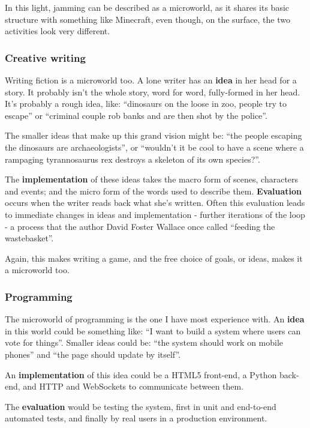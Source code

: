 In this light, jamming can be described as a microworld, as it shares
its basic structure with something like Minecraft, even though, on the
surface, the two activities look very different.

\subsubsection{Creative writing}

Writing fiction is a microworld too. A lone writer has an \textbf{idea}
in her head for a story. It probably isn't the whole story, word for
word, fully-formed in her head. It's probably a rough idea, like:
``dinosaurs on the loose in zoo, people try to escape'' or ``criminal
couple rob banks and are then shot by the police''.

The smaller ideas that make up this grand vision might be: ``the people
escaping the dinosaurs are archaeologists'', or ``wouldn't it be cool to
have a scene where a rampaging tyrannosaurus rex destroys a skeleton of
its own species?''.

The \textbf{implementation} of these ideas takes the macro form of
scenes, characters and events; and the micro form of the words used to
describe them. \textbf{Evaluation} occurs when the writer reads back
what she's written. Often this evaluation leads to immediate changes in ideas and implementation - further iterations of the loop - a process that the author David Foster Wallace once called ``feeding the wastebasket''\cite{flesh}.

Again, this makes writing a game, and the free choice of goals, or
ideas, makes it a microworld too.

\subsubsection{Programming}

The microworld of programming is the one I have most experience with. An
\textbf{idea} in this world could be something like: ``I want to build a
system where users can vote for things''. Smaller ideas could be: ``the
system should work on mobile phones'' and ``the page should update by
itself''.

An \textbf{implementation} of this idea could be a HTML5 front-end, a Python
back-end, and HTTP and WebSockets to communicate between them.

The \textbf{evaluation} would be testing the system, first in unit and
end-to-end automated tests, and finally by real users in a production
environment.

